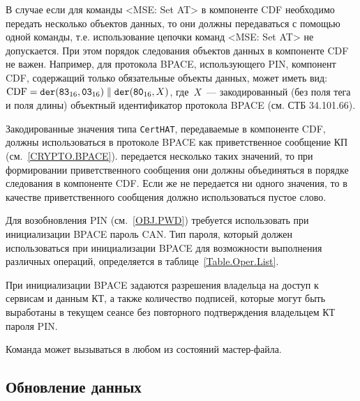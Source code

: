 В случае если для команды <MSE: Set AT> в компоненте CDF необходимо 
передать несколько объектов данных, то они должны передаваться с помощью 
одной команды, т.е. использование цепочки команд <MSE: Set AT> не 
допускается. При этом порядок следования объектов данных в компоненте CDF 
не важен. Например, для протокола BPACE, использующего PIN, компонент CDF, 
содержащий только обязательные объекты данных, может иметь вид: 
$\text{CDF} = 
\texttt{der}(\texttt{83}_{16}, \texttt{03}_{16}) \parallel 
\texttt{der}(\texttt{80}_{16}, X)$, где~$X$~--- закодированный (без поля тега и 
поля длины) объектный идентификатор протокола BPACE (см. СТБ 34.101.66).

Закодированные значения типа \verb|CertHAT|, передаваемые в компоненте CDF, 
должны использоваться в протоколе BPACE как приветственное сообщение КП
(см.~\ref{CRYPTO.BPACE}).
 передается несколько таких значений,
то при формировании приветственного сообщения они 
должны объединяться в порядке следования в компоненте CDF.
Если же не передается ни одного значения, то в качестве 
приветственного сообщения должно использоваться пустое слово. 
 

Для возобновления PIN (см.~\ref{OBJ.PWD}) требуется 
использовать при инициализации BPACE пароль CAN. 
Тип пароля, который должен использоваться при 
инициализации BPACE для возможности выполнения различных 
операций, определяется в таблице~\ref{Table.Oper.List}.

При инициализации BPACE задаются разрешения 
владельца на доступ к сервисам и данным  
КТ, а также количество подписей, которые могут быть выработаны 
в текущем сеансе без повторного подтверждения владельцем КТ пароля PIN.

Команда может вызываться в любом из состояний  мастер-файла.

\subsection{Обновление данных}
\label{Oper.Descr.Update}

